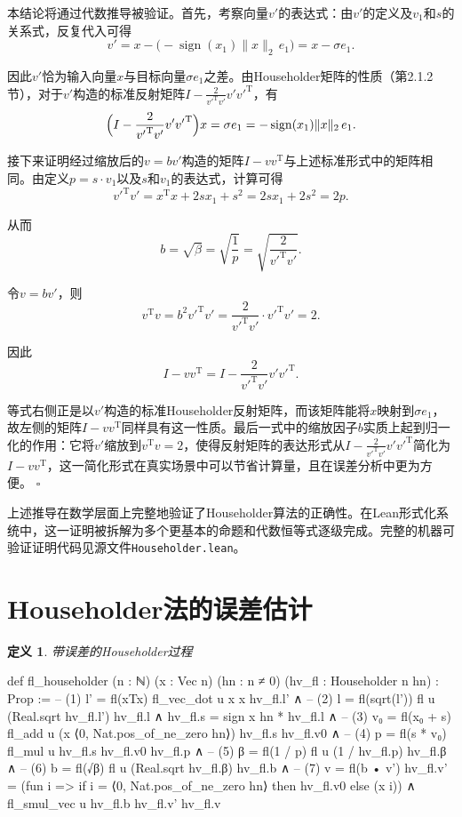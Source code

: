 ﻿\documentclass[UTF8,a4paper,openany]{ctexbook}
\DeclareMathOperator{\sign}{sign}
\theoremstyle{qrplain}
\newtheorem{definition}{定义}[chapter]
\renewenvironment{proof}[1][证明]
{\par\noindent{\qrthmchinese\bfseries #1. }\ignorespaces}
{\hfill$\square$\par}
\begin{document}
\begin{proof}
本结论将通过代数推导被验证。首先，考察向量$v'$的表达式：由$v'$的定义及$v_1$和$s$的关系式，反复代入可得
$$
v' = x - \bigl(-\sign(x_1)\|x\|_2\,e_1\bigr) = x - \sigma e_1.
$$

因此$v'$恰为输入向量$x$与目标向量$\sigma e_1$之差。由Householder矩阵的性质（第2.1.2节），对于$v'$构造的标准反射矩阵$I-\frac{2}{{v'}^\mathrm{T}v'}v'{v'}^\mathrm{T}$，有
$$
\Bigl(I - \frac{2}{{v'}^\mathrm{T}v'}v'{v'}^\mathrm{T}\Bigr)x = \sigma e_1 = -\sign(x_1)\|x\|_2\,e_1.
$$

接下来证明经过缩放后的$v = bv'$构造的矩阵$I-vv^\mathrm{T}$与上述标准形式中的矩阵相同。由定义$p = s\cdot v_1$以及$s$和$v_1$的表达式，计算可得
$$
{v'}^\mathrm{T}v' = x^\mathrm{T}x + 2sx_1 + s^2 = 2sx_1 + 2s^2 = 2p.
$$

从而
$$
b = \sqrt{\beta} = \sqrt{\frac{1}{p}} = \sqrt{\frac{2}{{v'}^\mathrm{T}v'}}.
$$

令$v = bv'$，则
$$
v^\mathrm{T}v = b^2 {v'}^\mathrm{T}v' = \frac{2}{{v'}^\mathrm{T}v'}\cdot {v'}^\mathrm{T}v' = 2.
$$

因此
$$
I - vv^\mathrm{T} = I - \frac{2}{{v'}^\mathrm{T}v'}v'{v'}^\mathrm{T}.
$$

等式右侧正是以$v'$构造的标准Householder反射矩阵，而该矩阵能将$x$映射到$\sigma e_1$，故左侧的矩阵$I-vv^\mathrm{T}$同样具有这一性质。最后一式中的缩放因子$b$实质上起到归一化的作用：它将$v'$缩放到$v^\mathrm{T}v=2$，使得反射矩阵的表达形式从$I-\frac{2}{{v'}^\mathrm{T}v'}v'{v'}^\mathrm{T}$简化为$I-vv^\mathrm{T}$，这一简化形式在真实场景中可以节省计算量，且在误差分析中更为方便。
\end{proof}

上述推导在数学层面上完整地验证了Householder算法的正确性。在Lean形式化系统中，这一证明被拆解为多个更基本的命题和代数恒等式逐级完成。完整的机器可验证证明代码见源文件\texttt{Householder.lean}。

\section{Householder法的误差估计}

\begin{definition}
  带误差的Householder过程
\end{definition}
\begin{leancode}
  def fl_householder (n : ℕ) (x : Vec n) (hn : n ≠ 0)
    (hv_fl : Householder n hn) : Prop :=
      -- (1) l' = fl(xTx)
      fl_vec_dot u x x hv_fl.l' ∧
      -- (2) l = fl(sqrt(l'))
      fl u (Real.sqrt hv_fl.l') hv_fl.l ∧
      hv_fl.s = sign x hn * hv_fl.l ∧
      -- (3) v₀ = fl(x₀ + s)
      fl_add u (x ⟨0, Nat.pos_of_ne_zero hn⟩) hv_fl.s hv_fl.v0 ∧
      -- (4) p = fl(s * v₀)
      fl_mul u hv_fl.s hv_fl.v0 hv_fl.p ∧
      -- (5) β = fl(1 / p)
      fl u (1 / hv_fl.p) hv_fl.β ∧
      -- (6) b = fl(√β)
      fl u (Real.sqrt hv_fl.β) hv_fl.b ∧
      -- (7) v = fl(b • v')
      hv_fl.v' = (fun i => if i = ⟨0, Nat.pos_of_ne_zero hn⟩ 
                            then hv_fl.v0 
                            else (x i)) ∧
      fl_smul_vec u hv_fl.b hv_fl.v' hv_fl.v
\end{leancode}
\end{document}
